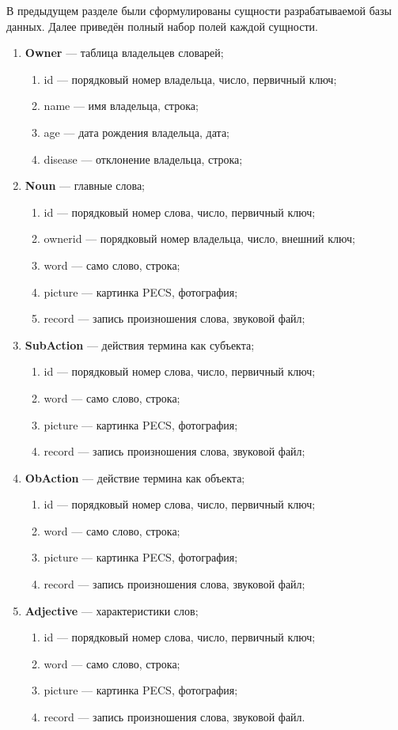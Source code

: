 В предыдущем разделе были сформулированы сущности разрабатываемой базы данных. Далее приведён полный набор полей каждой сущности.
\begin{enumerate}[label=\arabic*.]
	\item \textbf{Owner} --- таблица владельцев словарей;
	\begin{enumerate}[label=\alph*.]
		\item id --- порядковый номер владельца, число, первичный ключ;
		\item name --- имя владельца, строка;
		\item age --- дата рождения владельца, дата;
		\item disease --- отклонение владельца, строка;
	\end{enumerate}
	\item \textbf{Noun} --- главные слова;
	\begin{enumerate}[label=\alph*.]
		\item id --- порядковый номер слова, число, первичный ключ;
		\item ownerid --- порядковый номер владельца, число, внешний ключ;
		\item word --- само слово, строка;
		\item picture --- картинка PECS, фотография;
		\item record --- запись произношения слова, звуковой файл;
	\end{enumerate}
	\item \textbf{SubAction} --- действия термина как субъекта;
	\begin{enumerate}[label=\alph*.]
		\item id --- порядковый номер слова, число, первичный ключ;
		\item word --- само слово, строка;
		\item picture --- картинка PECS, фотография;
		\item record --- запись произношения слова, звуковой файл;
	\end{enumerate}
	\item \textbf{ObAction} --- действие термина как объекта;
	\begin{enumerate}[label=\alph*.]
		\item id --- порядковый номер слова, число, первичный ключ;
		\item word --- само слово, строка;
		\item picture --- картинка PECS, фотография;
		\item record --- запись произношения слова, звуковой файл;
	\end{enumerate}
	\item \textbf{Adjective} --- характеристики слов;
	\begin{enumerate}[label=\alph*.]
		\item id --- порядковый номер слова, число, первичный ключ;
		\item word --- само слово, строка;
		\item picture --- картинка PECS, фотография;
		\item record --- запись произношения слова, звуковой файл.
	\end{enumerate}
\end{enumerate}

